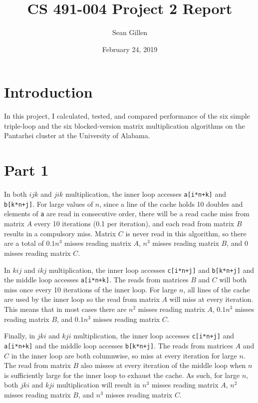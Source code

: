 \documentclass[12pt,letterpaper,oneside]{article}
\begin{document}
\title{CS 491-004 Project 2 Report}
\author{Sean Gillen}
\date{February 24, 2019}
\maketitle

\section*{Introduction}
In this project, I calculated, tested, and compared performance of the six simple triple-loop and the six blocked-version matrix multiplication algorithms on the Pantarhei cluster at the University of Alabama.

\section*{Part 1}
In both $ijk$ and $jik$ multiplication, the inner loop accesses \texttt{a[i*n+k]} and \texttt{b[k*n+j]}.
For large values of $n$, since a line of the cache holds 10 doubles and elements of \texttt{a} are read in consecutive order, there will be a read cache miss from matrix $A$ every 10 iterations (0.1 per iteration),
and each read from matrix $B$ results in a compulsory miss. Matrix $C$ is never read in this algorithm, so there are a total of $0.1n^3$ misses reading matrix $A$, $n^3$ misses reading matrix $B$, and 0 misses reading matrix $C$.

In $kij$ and $ikj$ multiplication, the inner loop accesses \texttt{c[i*n+j]} and \texttt{b[k*n+j]} and the middle loop accesses \texttt{a[i*n+k]}.
The reads from matrices $B$ and $C$ will both miss once every 10 iterations of the inner loop. For large $n$, all lines of the cache are used by the inner loop so the read from matrix $A$ will miss at every iteration.
This means that in most cases there are $n^2$ misses reading matrix $A$, $0.1n^3$ misses reading matrix $B$, and $0.1n^3$ misses reading matrix $C$.

Finally, in $jki$ and $kji$ multiplication, the inner loop accesses \texttt{c[i*n+j]} and \texttt{a[i*n+k]} and the middle loop accesses \texttt{b[k*n+j]}.
The reads from matrices $A$ and $C$ in the inner loop are both columnwise, so miss at every iteration for large $n$.
The read from matrix $B$ also misses at every iteration of the middle loop when $n$ is sufficiently large for the inner loop to exhaust the cache.
As such, for large $n$, both $jki$ and $kji$ multiplication will result in $n^3$ misses reading matrix $A$, $n^2$ misses reading matrix $B$, and $n^3$ misses reading matrix $C$.
\end{document}

